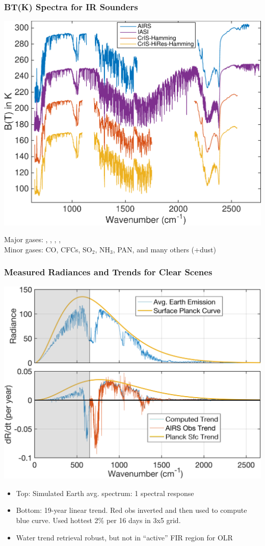 \documentclass[10pt,t]{beamer}
\begin{document}
\begin{frame}
\frametitle{BT(K) Spectra for IR Sounders}  
\begin{center}
\vspace{-0.05in}
\includegraphics[width=0.8\linewidth]{SunClimate2022/hyperall_hamming.pdf}
\end{center}
\vspace{-0.1in}
\small Major gases: \cd, \water, \ozone, \methane, \nitrous \\
\small Minor gases: CO, CFCs, SO$_2$, NH$_3$, PAN, and many others (+dust)
\end{frame}
\begin{frame}
\frametitle{Measured Radiances and Trends for Clear Scenes}
\centering \includegraphics[width=0.7\linewidth]{Figslls/rad_trends_all_cm.png}
\begin{small}
\begin{itemize}
\item Top: Simulated Earth avg. spectrum: 1 \wn spectral response
\item Bottom: 19-year linear trend.  Red obs inverted and then used to compute blue curve.  Used hottest 2\% per 16 days in 3x5 grid.
\item Water trend retrieval robust, but not in ``active'' FIR region for OLR
\end{itemize}
\end{small}
\end{frame}
\end{document}

